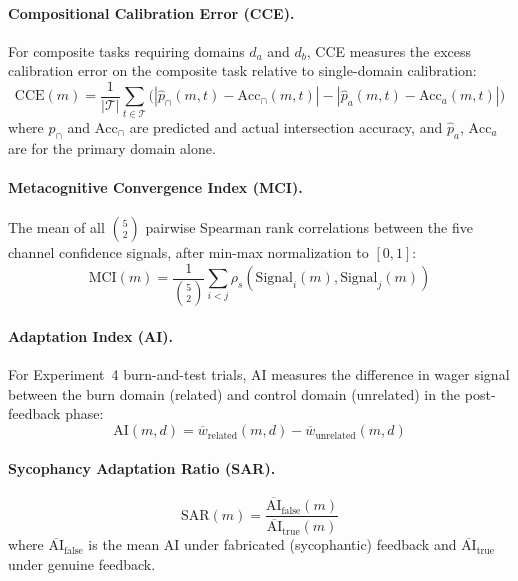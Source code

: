 \documentclass[10pt]{article}
\newcommand{\MCI}{MCI}
\newcommand{\CCE}{CCE}
\newcommand{\SAR}{SAR}
\newcommand{\AI}{AI}
\begin{document}
\paragraph{Compositional Calibration Error (\CCE{}).}
For composite tasks requiring domains $d_a$ and $d_b$, CCE measures the excess calibration error on the composite task relative to single-domain calibration:
\begin{equation}
\text{CCE}(m) = \frac{1}{|\mathcal{T}|} \sum_{t \in \mathcal{T}} \bigl(|\hat{p}_{\cap}(m,t) - \text{Acc}_{\cap}(m,t)| - |\hat{p}_{a}(m,t) - \text{Acc}_{a}(m,t)|\bigr)
\end{equation}
where $\hat{p}_{\cap}$ and $\text{Acc}_{\cap}$ are predicted and actual intersection accuracy, and $\hat{p}_a$, $\text{Acc}_a$ are for the primary domain alone.

\paragraph{Metacognitive Convergence Index (\MCI{}).}
The mean of all $\binom{5}{2}$ pairwise Spearman rank correlations between the five channel confidence signals, after min-max normalization to $[0,1]$:
\begin{equation}
\text{MCI}(m) = \frac{1}{\binom{5}{2}} \sum_{i < j} \rho_s(\text{Signal}_i(m), \text{Signal}_j(m))
\end{equation}

\paragraph{Adaptation Index (\AI{}).}
For Experiment~4 burn-and-test trials, AI measures the difference in wager signal between the burn domain (related) and control domain (unrelated) in the post-feedback phase:
\begin{equation}
\text{AI}(m, d) = \overline{w}_{\text{related}}(m, d) - \overline{w}_{\text{unrelated}}(m, d)
\end{equation}

\paragraph{Sycophancy Adaptation Ratio (\SAR{}).}
\begin{equation}
\text{SAR}(m) = \frac{\overline{\text{AI}}_{\text{false}}(m)}{\overline{\text{AI}}_{\text{true}}(m)}
\end{equation}
where $\overline{\text{AI}}_{\text{false}}$ is the mean AI under fabricated (sycophantic) feedback and $\overline{\text{AI}}_{\text{true}}$ under genuine feedback.
\end{document}
